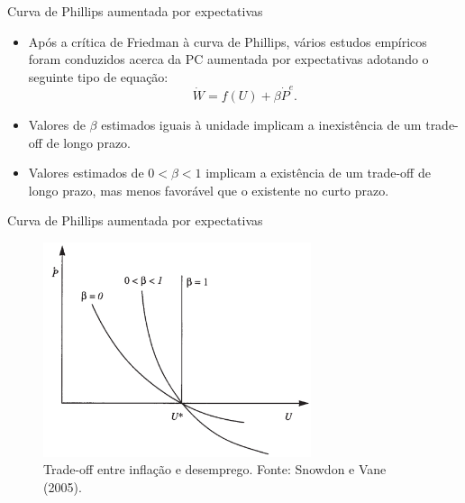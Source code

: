 \documentclass[10pt]{beamer}
\begin{document}
\begin{frame}{Curva de Phillips aumentada por expectativas}
    \begin{itemize}
        \item Após a crítica de Friedman à curva de Phillips, vários estudos empíricos foram conduzidos acerca da PC aumentada por expectativas adotando o seguinte tipo de equação:
        \begin{equation}
            \dot{W} = f(U) + \beta \dot{P}^e.
            \label{eq2}
        \end{equation}
        \bigskip
        \item Valores de $\beta$ estimados iguais à unidade implicam a inexistência de um trade-off de longo prazo.
        \bigskip
        \item Valores estimados de $0<\beta<1$ implicam a existência de um trade-off de longo prazo, mas menos favorável que o existente no curto prazo.
    \end{itemize}    
\end{frame}

\begin{frame}{Curva de Phillips aumentada por expectativas}
    \begin{figure}
        \centering
        \includegraphics[width=0.7\textwidth]{./figures/aula10_fig12.PNG}
        \caption{Trade-off entre inflação e desemprego. Fonte: Snowdon e Vane (2005).}
        \label{fig12}
    \end{figure}
\end{frame}
\end{document}
